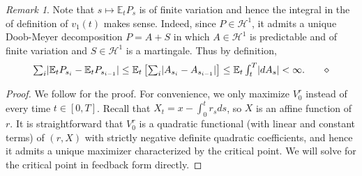 \documentclass[openany,oneside]{article}
\theoremstyle{definition}
\theoremstyle{remark}
\newtheorem{rem}[thm]{Remark}
\newcommand{\E}{\mathbb{E}} %
\DeclarePairedDelimiter{\abs}{\lvert}{\rvert} %
\newcommand{\ts}{\textstyle}
\newcommand{\closeEqn}{\tag*{$\diamond$}}
\begin{document}
\begin{rem}
Note that $s\mapsto \E_t P_s$ is of finite variation and hence the integral in the of definition of $v_1(t)$ makes sense. Indeed, since $P\in \mathcal{H}^1$, it admits a unique Doob-Meyer decomposition $P=A+S$ in which $A\in\mathcal{H}^1$ is predictable and of finite variation and $S\in\mathcal{H}^1$ is a martingale. Thus by definition,
\[
 \ts \sum_i \abs{\E_t P_{s_i} - \E_t P_{s_{i-1}}} \le \E_t\left[\sum_i \abs{A_{s_i} - A_{s_{i-1}}}\right] \le \E_t \int_t^T \abs{d A_s} < \infty.\closeEqn
\]
\end{rem}

\begin{proof}
We follow \cite{bouchard2017equilibrium} for the proof. For convenience, we only maximize $V^r_0$ instead of every time $t\in[0,T]$. Recall that $X_t = x-\int_0^t r_s ds$, so $X$ is an affine function of $r$. It is straightforward that $V^r_0$ is a quadratic functional (with linear and constant terms) of $(r,X)$ with strictly negative definite quadratic coefficients, and hence it admits a unique maximizer characterized by the critical point. We will solve for the critical point in feedback form directly.


\end{proof}
\end{document}
